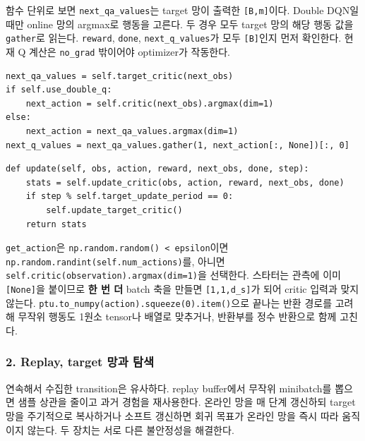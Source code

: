 \documentclass[11pt,a4paper]{article}
\begin{document}
함수 단위로 보면 \texttt{next\_\allowbreak{}qa\_\allowbreak{}values}는 target 망이 출력한 \texttt{[B,\allowbreak{}m]}이다. Double DQN일 때만 online 망의 argmax로 행동을 고른다. 두 경우 모두 target 망의 해당 행동 값을 \texttt{gather}로 읽는다. \texttt{reward}, \texttt{done}, \texttt{next\_\allowbreak{}q\_\allowbreak{}values}가 모두 \texttt{[B]}인지 먼저 확인한다. 현재 Q 계산은 \texttt{no\_\allowbreak{}grad} 밖이어야 optimizer가 작동한다.\par

\begin{verbatim}
next_qa_values = self.target_critic(next_obs)
if self.use_double_q:
    next_action = self.critic(next_obs).argmax(dim=1)
else:
    next_action = next_qa_values.argmax(dim=1)
next_q_values = next_qa_values.gather(1, next_action[:, None])[:, 0]
\end{verbatim}

\begin{verbatim}
def update(self, obs, action, reward, next_obs, done, step):
    stats = self.update_critic(obs, action, reward, next_obs, done)
    if step % self.target_update_period == 0:
        self.update_target_critic()
    return stats
\end{verbatim}

\texttt{get\_\allowbreak{}action}은 \texttt{np.\allowbreak{}random.\allowbreak{}random() < epsilon}이면 \texttt{np.\allowbreak{}random.\allowbreak{}randint(self.\allowbreak{}num\_\allowbreak{}actions)}를, 아니면 \texttt{self.\allowbreak{}critic(observation).\allowbreak{}argmax(dim=1)}을 선택한다. 스타터는 관측에 이미 \texttt{[None]}을 붙이므로 \textbf{한 번 더} batch 축을 만들면 \texttt{[1,\allowbreak{}1,\allowbreak{}d\_\allowbreak{}s]}가 되어 critic 입력과 맞지 않는다. \texttt{ptu.\allowbreak{}to\_\allowbreak{}numpy(action).\allowbreak{}squeeze(0).\allowbreak{}item()}으로 끝나는 반환 경로를 고려해 무작위 행동도 1원소 tensor나 배열로 맞추거나, 반환부를 정수 반환으로 함께 고친다.\par

\subsubsection{2. Replay, target 망과 탐색}

연속해서 수집한 transition은 유사하다. replay buffer에서 무작위 minibatch를 뽑으면 샘플 상관을 줄이고 과거 경험을 재사용한다. 온라인 망을 매 단계 갱신하되 target 망을 주기적으로 복사하거나 소프트 갱신하면 회귀 목표가 온라인 망을 즉시 따라 움직이지 않는다. 두 장치는 서로 다른 불안정성을 해결한다.\par
\end{document}
